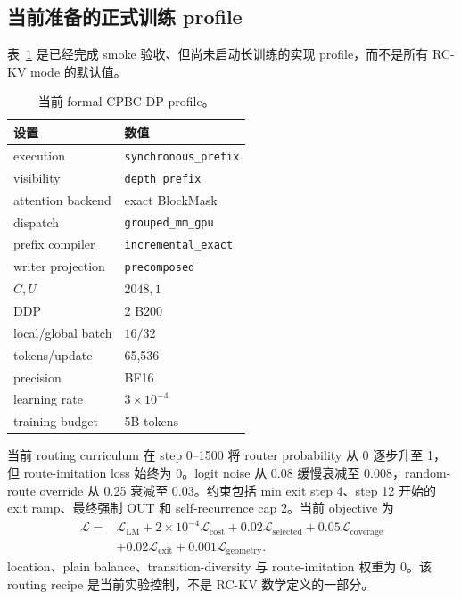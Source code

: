 \documentclass[UTF8,twocolumn,10pt,a4paper]{ctexart}
\newcommand{\RCKV}{\textsf{RC-KV}}
\newcommand{\DP}{\textsf{CPBC-DP}}
\newcommand{\code}[1]{\texttt{#1}}
\begin{document}
\subsection{当前准备的正式训练 profile}
表~\ref{tab:formal-profile} 是已经完成 smoke 验收、但尚未启动长训练的实现 profile，而不是所有 \RCKV{} mode 的默认值。

\begin{table}[t]
\centering
\caption{当前 formal \DP{} profile。}
\label{tab:formal-profile}
\small
\begin{tabular}{ll}
\toprule
设置 & 数值 \\
\midrule
execution & \code{synchronous\_prefix} \\
visibility & \code{depth\_prefix} \\
attention backend & exact BlockMask \\
dispatch & \code{grouped\_mm\_gpu} \\
prefix compiler & \code{incremental\_exact} \\
writer projection & \code{precomposed} \\
$C,U$ & $2048,1$ \\
DDP & 2 B200 \\
local/global batch & $16/32$ \\
tokens/update & 65,536 \\
precision & BF16 \\
learning rate & $3\times10^{-4}$ \\
training budget & 5B tokens \\
\bottomrule
\end{tabular}
\end{table}

当前 routing curriculum 在 step 0--1500 将 router probability 从 0 逐步升至 1，但 route-imitation loss 始终为 0。logit noise 从 0.08 缓慢衰减至 0.008，random-route override 从 0.25 衰减至 0.03。约束包括 min exit step 4、step 12 开始的 exit ramp、最终强制 OUT 和 self-recurrence cap 2。当前 objective 为
\begin{align}
  \mathcal L={}&\mathcal L_{\mathrm{LM}}
  +2\!\times\!10^{-4}\mathcal L_{\mathrm{cost}}
  +0.02\mathcal L_{\mathrm{selected}}
  +0.05\mathcal L_{\mathrm{coverage}}\nonumber\\
  &+0.02\mathcal L_{\mathrm{exit}}
  +0.001\mathcal L_{\mathrm{geometry}}.
  \label{eq:objective}
\end{align}
location、plain balance、transition-diversity 与 route-imitation 权重为 0。该 routing recipe 是当前实验控制，不是 \RCKV{} 数学定义的一部分。
\end{document}
